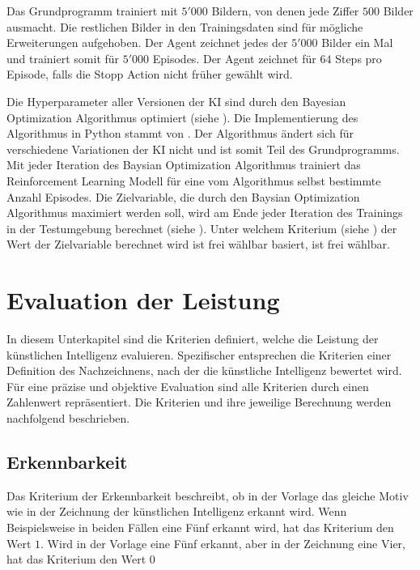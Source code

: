  
Das Grundprogramm trainiert mit $5'000$ Bildern, von denen jede Ziffer $500$
Bilder ausmacht. Die restlichen Bilder in den Trainingsdaten sind für mögliche 
Erweiterungen aufgehoben. Der Agent zeichnet jedes der $5'000$ Bilder ein Mal und
trainiert somit für $5'000$ Episodes. Der Agent zeichnet für $64$ Steps pro
Episode, falls die Stopp Action nicht früher gewählt wird.
 
Die Hyperparameter aller Versionen der KI sind durch den Bayesian Optimization
Algorithmus optimiert (siehe ). Die Implementierung
des Algorithmus in Python stammt von \cite{fernando_nogueira_bayesian_2014}. Der
Algorithmus ändert sich für verschiedene Variationen der KI nicht und ist somit
Teil des Grundprogramms. Mit jeder Iteration des Baysian Optimization
Algorithmus trainiert das Reinforcement Learning Modell für eine vom Algorithmus
selbst bestimmte Anzahl Episodes. Die Zielvariable, die durch den Baysian
Optimization Algorithmus maximiert werden soll, wird am Ende jeder Iteration des
Trainings in der Testumgebung berechnet (siehe ).
Unter welchem Kriterium (siehe ) der Wert der
Zielvariable berechnet wird ist frei wählbar  
basiert, ist frei wählbar.
 
\section{Evaluation der Leistung}\label{chap:m_eval} In diesem Unterkapitel sind
die Kriterien definiert, welche die Leistung der künstlichen Intelligenz
evaluieren. Spezifischer entsprechen die Kriterien einer Definition des
Nachzeichnens, nach der die künstliche Intelligenz bewertet wird. Für eine
präzise und objektive Evaluation sind alle Kriterien durch einen Zahlenwert
repräsentiert. Die Kriterien und ihre jeweilige Berechnung werden nachfolgend
beschrieben.
 
\subsection{Erkennbarkeit}\label{sub:m_eval_rec}
Das Kriterium der Erkennbarkeit beschreibt, ob in der Vorlage das gleiche Motiv
wie in der Zeichnung der künstlichen Intelligenz erkannt wird. Wenn
Beispielsweise in beiden Fällen eine Fünf erkannt wird, hat das Kriterium den
Wert $1$. Wird in der Vorlage eine Fünf erkannt, aber in der Zeichnung eine
Vier, hat das Kriterium den Wert $0$
 
